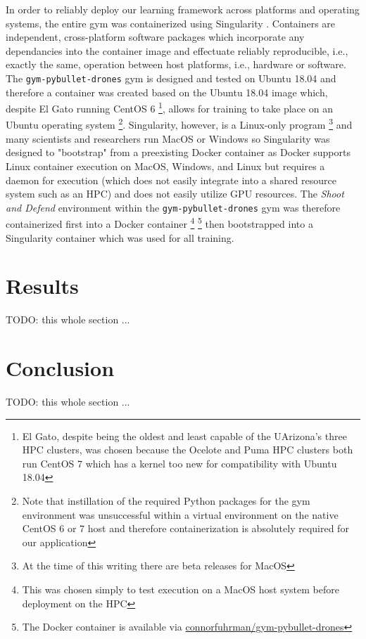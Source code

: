 \documentclass{article}
\begin{document}
\noindent
In order to reliably deploy our learning framework across platforms and operating systems, the entire gym was containerized using Singularity \cite{singularity}. 
Containers are independent, cross-platform software packages which incorporate any dependancies into the container image and effectuate reliably reproducible, i.e., exactly the same, operation between host platforms, i.e., hardware or software. 
The \texttt{gym-pybullet-drones} gym is designed and tested on Ubuntu 18.04 and therefore a container was created based on the Ubuntu 18.04 image which, despite El Gato running CentOS 6 \footnote{El Gato, despite being the oldest and least capable of the UArizona's three HPC clusters, was chosen because the Ocelote and Puma HPC clusters both run CentOS 7 which has a kernel too new for compatibility with Ubuntu 18.04}, allows for training to take place on an Ubuntu operating system \footnote{Note that instillation of the required Python packages for the gym environment was unsuccessful within a virtual environment on the native CentOS 6 or 7 host and therefore containerization is absolutely required for our application}. 
Singularity, however, is a Linux-only program \footnote{At the time of this writing there are beta releases for MacOS} and many scientists and researchers run MacOS or Windows so Singularity was designed to "bootstrap" from a preexisting Docker \cite{docker} container as Docker supports Linux container execution on MacOS, Windows, and Linux but requires a daemon for execution (which does not easily integrate into a shared resource system such as an HPC) and does not easily utilize GPU resources. 
The \textit{Shoot and Defend} environment within the \texttt{gym-pybullet-drones} gym was therefore containerized first into a Docker container \footnote{This was chosen simply to test execution on a MacOS host system before deployment on the HPC} \footnote{The Docker container is available via \href{https://hub.docker.com/repository/docker/connorfuhrman/gym-pybullet-drones}{connorfuhrman/gym-pybullet-drones}} then bootstrapped into a Singularity container which was used for all training. 

\section{Results} \label{sec:results}
TODO: this whole section ... 

\section{Conclusion} \label{sec:conclusion}
TODO: this whole section ... 
\end{document}
